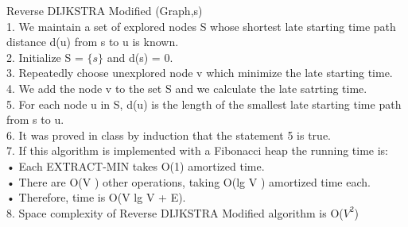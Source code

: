 \documentclass[10 pt]{article}
\begin{document}
Reverse DIJKSTRA Modified  (Graph,s)\\
1. We maintain a set of explored nodes S whose  shortest late starting time path distance d(u) from s to u is known.\\
2. Initialize S = $\{s\}$ and d(s) = 0.\\
3. Repeatedly choose unexplored node  v which minimize the late starting time.\\
4. We add the node v to the set S and we calculate the late satrting  time.\\
5. For each node u in S, d(u) is the length of the smallest late starting time  path from s to u.\\
6. It was proved in class by induction that the statement 5 is true.\\
7. If this algorithm is implemented with a Fibonacci heap the running time is:\\
• Each EXTRACT-MIN takes O(1) amortized time.\\
• There are O(V ) other operations, taking O(lg V ) amortized time each.\\
• Therefore, time is O(V lg V + E).\\
8. Space complexity of Reverse DIJKSTRA Modified  algorithm is O($V^2$)\\
\end{document}
